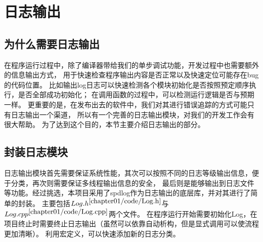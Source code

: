 \section{日志输出}

\subsection{为什么需要日志输出}
在程序运行过程中，除了编译器带给我们的单步调试功能，开发过程中也需要额外的信息输出方式，
用于快速检查程序输出内容是否正常以及快速定位可能存在bug的代码位置。
比如输出log日志可以快速检测各个模块初始化是否按照预定顺序执行，是否全部成功初始化；
在调用函数的过程中，可以检测运行逻辑是否与预期一样。
更重要的是，在发布出去的软件中，我们对其进行错误追踪的方式可能只有日志输出一个渠道，
所以有一个完善的日志输出模块，对我们的开发工作会有很大帮助。
为了达到这个目的，本节主要介绍日志输出的部分。

\subsection{封装日志模块}
日志输出模块首先需要保证系统性能，其次可以按照不同的日志等级输出信息，便于分类，再次则需要保证多线程输出信息的安全，
最后则是能够输出到日志文件等功能。经过挑选，本项目采用了spdlog作为日志输出的底层库，并对其进行了简单的封装。
主要包括$Log.h^{\ref{chapter01/code/Log.h}}$与$Log.cpp^{\ref{chapter01/code/Log.cpp}}$两个文件。
在程序运行开始需要初始化Log，在项目终止时需要终止日志输出（虽然可以依靠自动析构，但是显式调用可以使流程更加清晰）。
利用宏定义，可以快速添加新的日志分类。




